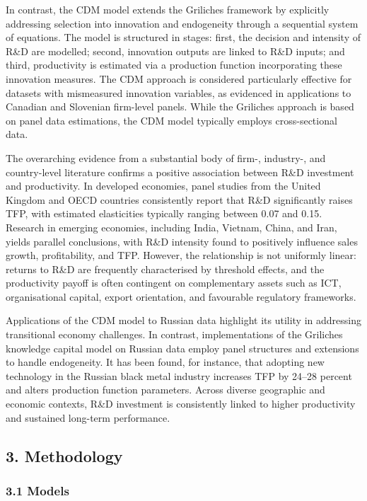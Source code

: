 \documentclass[a4paper, 12pt]{article}
\begin{document}
In contrast, the CDM model extends the Griliches framework by explicitly addressing selection into innovation and endogeneity through a sequential system of equations. The model is structured in stages: first, the decision and intensity of R\&D are modelled; second, innovation outputs are linked to R\&D inputs; and third, productivity is estimated via a production function incorporating these innovation measures. The CDM approach is considered particularly effective for datasets with mismeasured innovation variables, as evidenced in applications to Canadian and Slovenian firm-level panels. While the Griliches approach is based on panel data estimations, the CDM model typically employs cross-sectional data.

The overarching evidence from a substantial body of firm-, industry-, and country-level literature confirms a positive association between R\&D investment and productivity. In developed economies, panel studies from the United Kingdom and OECD countries consistently report that R\&D significantly raises TFP, with estimated elasticities typically ranging between 0.07 and 0.15. Research in emerging economies, including India, Vietnam, China, and Iran, yields parallel conclusions, with R\&D intensity found to positively influence sales growth, profitability, and TFP. However, the relationship is not uniformly linear: returns to R\&D are frequently characterised by threshold effects, and the productivity payoff is often contingent on complementary assets such as ICT, organisational capital, export orientation, and favourable regulatory frameworks.

Applications of the CDM model to Russian data highlight its utility in addressing transitional economy challenges. In contrast, implementations of the Griliches knowledge capital model on Russian data employ panel structures and extensions to handle endogeneity. It has been found, for instance, that adopting new technology in the Russian black metal industry increases TFP by 24–28 percent and alters production function parameters. Across diverse geographic and economic contexts, R\&D investment is consistently linked to higher productivity and sustained long-term performance.

\subsection{3. Methodology}

\subsubsection{3.1 Models}
\end{document}
